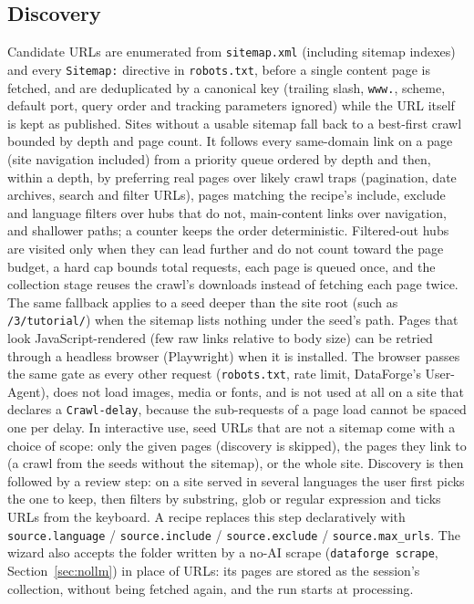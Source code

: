 \documentclass[11pt]{article}
\begin{document}
\subsection{Discovery}
\label{sec:discovery}
Candidate URLs are enumerated from \texttt{sitemap.xml} (including
sitemap indexes) and every \texttt{Sitemap:} directive in
\texttt{robots.txt}, before a single content page is fetched, and are
deduplicated by a canonical key (trailing slash, \texttt{www.}, scheme,
default port, query order and tracking parameters ignored) while the URL
itself is kept as published. Sites without a usable sitemap fall back to
a best-first crawl bounded by depth and page count. It follows every
same-domain link on a page (site navigation included) from a priority
queue ordered by depth and then, within a depth, by preferring real
pages over likely crawl traps (pagination, date archives, search and
filter URLs), pages matching the recipe's include, exclude and language
filters over hubs that do not, main-content links over navigation, and
shallower paths; a counter keeps the order deterministic. Filtered-out
hubs are visited only when they can lead further and do not count toward
the page budget, a hard cap bounds total requests, each page is queued
once, and the collection stage reuses the crawl's downloads instead of
fetching each page twice. The same fallback applies
to a seed deeper than the site root (such
as \texttt{/3/tutorial/}) when the sitemap lists nothing under the seed's
path. Pages that look JavaScript-rendered (few raw links relative to body
size) can be retried through a headless browser (Playwright) when it is
installed. The browser passes the same gate as every other request
(\texttt{robots.txt}, rate limit, DataForge's User-Agent), does not load
images, media or fonts, and is not used at all on a site that declares a
\texttt{Crawl-delay}, because the sub-requests of a page load cannot be
spaced one per delay. In interactive use, seed URLs that are not a
sitemap come with a choice of scope: only the given pages (discovery is
skipped), the pages they link to (a crawl from the seeds without the
sitemap), or the whole site. Discovery is then followed by a review
step: on a site served in several languages the user first picks the one
to keep, then filters by substring, glob or regular expression and ticks
URLs from the keyboard. A recipe replaces this step declaratively with
\texttt{source.language} / \texttt{source.include} /
\texttt{source.exclude} / \texttt{source.max\_urls}.
The wizard also accepts the folder written by a no-AI scrape
(\texttt{dataforge scrape}, Section~\ref{sec:nollm}) in place of URLs:
its pages are stored as the session's collection, without being fetched
again, and the run starts at processing.
\end{document}
